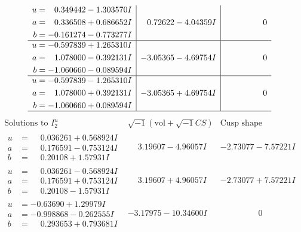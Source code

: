 \documentclass[1p]{elsarticle_modified}
\theoremstyle{definition}
\newcommand{\I}{\sqrt{-1}}
\begin{document}
$$\begin{array}{c|c|c}
\begin{aligned}
u &= \phantom{-}0.349442 - 1.303570 I \\
a &= \phantom{-}0.336508 + 0.686652 I \\
b &= -0.161274 - 0.773277 I\end{aligned}
 & \phantom{-}0.72622 - 4.04359 I & \phantom{-0.000000 } 0 \\ \hline\begin{aligned}
u &= -0.597839 + 1.265310 I \\
a &= \phantom{-}1.078000 - 0.392131 I \\
b &= -1.060660 - 0.089594 I\end{aligned}
 & -3.05365 - 4.69754 I & \phantom{-0.000000 } 0 \\ \hline\begin{aligned}
u &= -0.597839 - 1.265310 I \\
a &= \phantom{-}1.078000 + 0.392131 I \\
b &= -1.060660 + 0.089594 I\end{aligned}
 & -3.05365 + 4.69754 I & \phantom{-0.000000 } 0\\
 \hline 
 \end{array}$$\newpage$$\begin{array}{c|c|c}  
\text{Solutions to }I^u_{2}& \I (\text{vol} + \sqrt{-1}CS) & \text{Cusp shape}\\
 \hline 
\begin{aligned}
u &= \phantom{-}0.036261 + 0.568924 I \\
a &= \phantom{-}0.176591 - 0.753124 I \\
b &= \phantom{-}0.20108 + 1.57931 I\end{aligned}
 & \phantom{-}3.19607 - 4.96057 I & -2.73077 - 7.57221 I \\ \hline\begin{aligned}
u &= \phantom{-}0.036261 - 0.568924 I \\
a &= \phantom{-}0.176591 + 0.753124 I \\
b &= \phantom{-}0.20108 - 1.57931 I\end{aligned}
 & \phantom{-}3.19607 + 4.96057 I & -2.73077 + 7.57221 I \\ \hline\begin{aligned}
u &= -0.63690 + 1.29979 I \\
a &= -0.998868 - 0.262555 I \\
b &= \phantom{-}0.293653 + 0.793681 I\end{aligned}
 & -3.17975 - 10.34600 I & \phantom{-0.000000 } 0 \\ \hline\begin{aligned}

\end{aligned}
\end{array}$$
\end{document}
